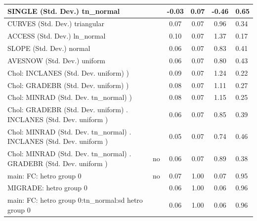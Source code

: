 \begin{table}
\begin{center}
\begin{tabular}{|l|l|c|c|c|l|}
			\hline
			SINGLE (Std. Dev.) tn_normal &  & -0.03 & 0.07 & -0.46 & 0.65 \\
			\hline
			CURVES (Std. Dev.) triangular &  & 0.07 & 0.07 & 0.96 & 0.34 \\
			\hline
			ACCESS (Std. Dev.) ln_normal &  & 0.10 & 0.07 & 1.37 & 0.17 \\
			\hline
			SLOPE (Std. Dev.) normal &  & 0.06 & 0.07 & 0.83 & 0.41 \\
			\hline
			AVESNOW (Std. Dev.) uniform &  & 0.06 & 0.07 & 0.80 & 0.43 \\
			\hline
			 Chol: INCLANES (Std. Dev. uniform) ) &  & 0.09 & 0.07 & 1.24 & 0.22 \\
			\hline
			 Chol: GRADEBR (Std. Dev. uniform) ) &  & 0.08 & 0.07 & 1.11 & 0.27 \\
			\hline
			 Chol: MINRAD (Std. Dev. tn_normal) ) &  & 0.08 & 0.07 & 1.15 & 0.25 \\
			\hline
			 Chol: GRADEBR (Std. Dev. uniform) . INCLANES (Std. Dev.   uniform ) &  & 0.06 & 0.07 & 0.85 & 0.39 \\
			\hline
			 Chol: MINRAD (Std. Dev. tn_normal) . INCLANES (Std. Dev.   uniform ) &  & 0.05 & 0.07 & 0.74 & 0.46 \\
			\hline
			 Chol: MINRAD (Std. Dev. tn_normal) . GRADEBR (Std. Dev.   uniform ) & no & 0.06 & 0.07 & 0.89 & 0.38 \\
			\hline
			main: FC: hetro group 0 & no & 0.07 & 1.00 & 0.07 & 0.95 \\
			\hline
			MIGRADE: hetro group 0 &  & 0.06 & 1.00 & 0.06 & 0.96 \\
			\hline
			main: FC: hetro group 0:tn_normal:sd  hetro group 0 &  & 0.06 & 1.00 & 0.06 & 0.96 \\
			\hline
		\end{tabular}
	\end{center}
\end{table}
